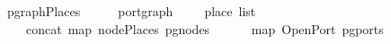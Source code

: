 \isamarkupfalse%
\ pgraphPlaces\ {\isacharcolon}{\isacharcolon}\ {\isachardoublequoteopen}{\isacharparenleft}\ \ \ \ port{\isacharunderscore}graph\ {\isasymRightarrow}\ {\isacharparenleft}\ \ \ place\ list{\isachardoublequoteclose}\isanewline
\ \ \ {\isachardoublequoteopen}\ \ {\isacharequal}\isanewline
\ \ \ \ concat\ {\isacharparenleft}map\ nodePlaces\ {\isacharparenleft}pg{\isacharunderscore}nodes\ \ {\isacharat}\isanewline
\ \ \ \ map\ OpenPort\ {\isacharparenleft}pg{\isacharunderscore}ports\ %
